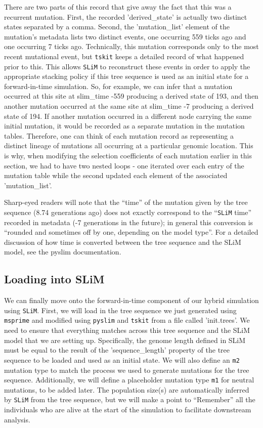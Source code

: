 \documentclass[12pt]{article}
\newcommand{\msprime}[0]{\texttt{msprime}\xspace}
\newcommand{\tskit}[0]{\texttt{tskit}\xspace}
\newcommand{\slim}[0]{\texttt{SLiM}\xspace}
\newcommand{\pyslim}[0]{\texttt{pyslim}\xspace}
\begin{document}
There are two parts of this record that give away the fact that this was a recurrent mutation. First, the recorded 'derived_state' is
actually two distinct states separated by a comma. Second, the 'mutation_list' element of the mutation's metadata lists two distinct
events, one occurring 559 ticks ago and one occurring 7 ticks ago. Technically, this mutation corresponds only to the most recent
mutational event, but \tskit keeps a detailed record of what happened prior to this. This allows \slim to reconstruct these events in order
to apply the appropriate stacking policy if this tree sequence is used as an initial state for a forward-in-time simulation. So, for example,
we can infer that a mutation occurred at this site at slim_time -559 producing a derived state of 193, and then another mutation
occurred at the same site at slim_time -7 producing a derived state of 194. If another mutation occurred in a different node carrying
the same initial mutation, it would be recorded as a separate mutation in the mutation tables. Therefore, one can think of each mutation
record as representing a distinct lineage of mutations all occurring at a particular genomic location. This is why, when modifying
the selection coefficients of each mutation earlier in this section, we had to have two nested loops - one iterated over each entry of the
mutation table while the second updated each element of the associated 'mutation_list'.

Sharp-eyed readers will note that the ``time'' of the mutation given by the tree sequence (8.74 generations ago) does not exactly
correspond to the ``\slim time'' recorded in metadata (-7 generations in the future); in general this conversion is ``rounded and sometimes
off by one, depending on the model type''. For a detailed discussion of how time is converted between the tree sequence and the SLiM
model, see the pyslim documentation.

\subsection*{Loading into SLiM}

We can finally move onto the forward-in-time component of our hybrid simulation using \slim. First, we will load in the tree sequence we just
generated using \msprime and modified using \pyslim and \tskit from a file called 'init.trees'. We need to ensure that everything matches
across this tree sequence and the SLiM model that we are setting up. Specifically, the genome length defined in SLiM must be equal to the
result of the 'sequence_length' property of the tree sequence to be loaded and used as an initial state. We will also define an \verb|m2|
mutation type to match the process we used to generate mutations for the tree sequence. Additionally, we will define a placeholder mutation
type \verb|m1| for neutral mutations, to be added later. The population size(s) are automatically inferred by \slim from the tree sequence,
but we will make a point to ``Remember'' all the individuals who are alive at the start of the simulation to facilitate downstream analysis.
\end{document}
